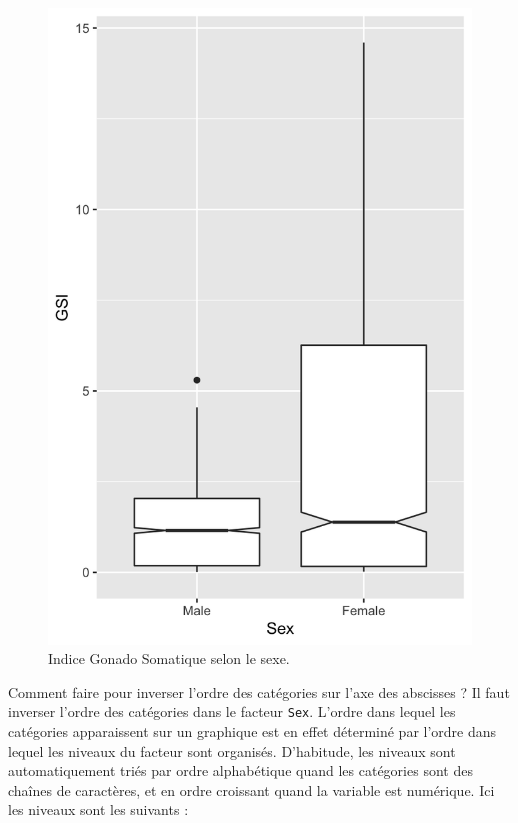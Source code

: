 \documentclass[
  a4paper,
]{article}
\newenvironment{Shaded}{\begin{snugshade}}{\end{snugshade}}
\newcommand{\DataTypeTok}[1]{\textcolor[rgb]{0.00,0.34,0.68}{#1}}
\newcommand{\KeywordTok}[1]{\textcolor[rgb]{0.12,0.11,0.11}{\textbf{#1}}}
\newcommand{\NormalTok}[1]{\textcolor[rgb]{0.12,0.11,0.11}{#1}}
\newcommand{\OperatorTok}[1]{\textcolor[rgb]{0.12,0.11,0.11}{#1}}
\newcommand{\OtherTok}[1]{\textcolor[rgb]{0.00,0.43,0.16}{#1}}
\newcommand{\StringTok}[1]{\textcolor[rgb]{0.75,0.01,0.01}{#1}}
\begin{document}
\begin{Shaded}
\end{Shaded}

\begin{figure}[htpb]

{\centering \includegraphics[width=0.5\linewidth]{figure/unnamed-chunk-137-1} 

}

\caption{Indice Gonado Somatique  selon le sexe.}\label{fig:unnamed-chunk-137}
\end{figure}

Comment faire pour inverser l'ordre des catégories sur l'axe des abscisses ? Il faut inverser l'ordre des catégories dans le facteur \texttt{Sex}. L'ordre dans lequel les catégories apparaissent sur un graphique est en effet déterminé par l'ordre dans lequel les niveaux du facteur sont organisés. D'habitude, les niveaux sont automatiquement triés par ordre alphabétique quand les catégories sont des chaînes de caractères, et en ordre croissant quand la variable est numérique. Ici les niveaux sont les suivants :

\begin{Shaded}
\end{Shaded}
\end{document}
